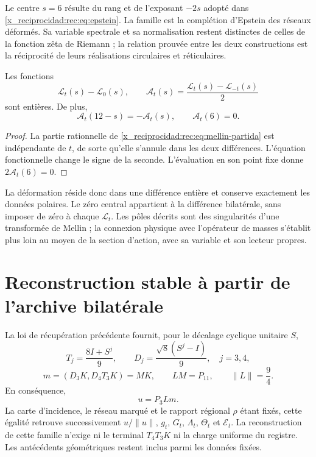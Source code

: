 Le centre \(s=6\) résulte du rang et de l’exposant \(-2s\) adopté dans \eqref{x_reciprocidad:rec:eq:epstein}. La famille est la complétion d’Epstein des réseaux déformés. Sa variable spectrale et sa normalisation restent distinctes de celles de la fonction zêta de Riemann ; la relation prouvée entre les deux constructions est la réciprocité de leurs réalisations circulaires et réticulaires.

\begin{corollary}
\label{x_reciprocidad:rec:cor:polar}
Les fonctions
\[
 \mathcal L_t(s)-\mathcal L_0(s),\qquad
 \mathcal A_t(s)=\frac{\mathcal L_t(s)-\mathcal L_{-t}(s)}2
\]
sont entières. De plus,
\[
 \mathcal A_t(12-s)=-\mathcal A_t(s),\qquad \mathcal A_t(6)=0.
\]
\end{corollary}
\begin{proof}
La partie rationnelle de \eqref{x_reciprocidad:rec:eq:mellin-partida} est indépendante de \(t\), de sorte qu’elle s’annule dans les deux différences. L’équation fonctionnelle change le signe de la seconde. L’évaluation en son point fixe donne \(2\mathcal A_t(6)=0\).
\end{proof}

La déformation réside donc dans une différence entière et conserve exactement les données polaires. Le zéro central appartient à la différence bilatérale, sans imposer de zéro à chaque \(\mathcal L_t\). Les pôles décrits sont des singularités d’une transformée de Mellin ; la connexion physique avec l’opérateur de masses s’établit plus loin au moyen de la section d’action, avec sa variable et son lecteur propres.

\section{Reconstruction stable à partir de l’archive bilatérale}
\label{x_reciprocidad:rec:archivo}

La loi de récupération précédente fournit, pour le décalage cyclique unitaire \(S\),
\[
 T_j=\frac{8I+S^j}{9},\qquad D_j=\frac{\sqrt8(S^j-I)}9,
 \quad j=3,4,
\]
\begin{equation}
 m=(D_3K,D_4T_3K)=MK,\qquad LM=P_{11},\qquad\|L\|=\frac94.
 \label{x_reciprocidad:rec:eq:archivo}
\end{equation}
En conséquence,
\begin{equation}
 u=P_3Lm.
 \label{x_reciprocidad:rec:eq:recuperacion-u}
\end{equation}
La carte d’incidence, le réseau marqué et le rapport régional \(\rho\) étant fixés, cette égalité retrouve successivement \(u/\|u\|\), \(g_t\), \(G_t\), \(\Lambda_t\), \(\Theta_t\) et \(\mathcal E_t\). La reconstruction de cette famille n’exige ni le terminal \(T_4T_3K\) ni la charge uniforme du registre. Les antécédents géométriques restent inclus parmi les données fixées.

